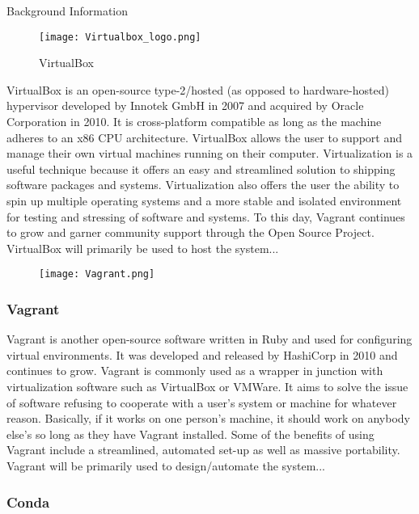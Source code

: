 \documentclass[a4paper,12pt]{article}
\begin{document}
\begin{section}{Background Information}
\begin{wrapfigure}{L}{0.5\textwidth}
\centering
\texttt{[image: Virtualbox\_logo.png]}
\caption{VirtualBox}
\end{wrapfigure}


VirtualBox is an open-source type-2/hosted (as opposed to hardware-hosted) hypervisor developed by Innotek GmbH in 2007 and acquired by Oracle Corporation in 2010. 
It is cross-platform compatible as long as the machine adheres to an x86 CPU architecture. VirtualBox allows the user to support and manage their own virtual machines running on their computer. Virtualization is a useful technique because it offers an easy and streamlined solution to shipping software packages and systems. Virtualization also offers the user the ability to spin up multiple operating systems and a more stable and isolated environment for testing and stressing of software and systems. To this day, Vagrant continues to grow and garner community support through the Open Source Project. VirtualBox will primarily be used to host the system...


\begin{wrapfigure}{R}{0.2\textwidth}
\begin{center}
\texttt{[image: Vagrant.png]}
\end{center}
\end{wrapfigure}

\subsubsection{Vagrant}

Vagrant is another open-source software written in Ruby and used for configuring virtual environments. It was developed and released by HashiCorp in 2010 and continues to grow. Vagrant is commonly used as a wrapper in junction with virtualization software such as VirtualBox or VMWare. It aims to solve the issue of software refusing to cooperate with a user's system or machine for whatever reason. Basically, if it works on one person's machine, it should work on anybody else's so long as they have Vagrant installed. Some of the benefits of using Vagrant include a streamlined, automated set-up as well as massive portability. Vagrant will be primarily used to design/automate the system...

\subsubsection{Conda}


\end{section}
\end{document}
